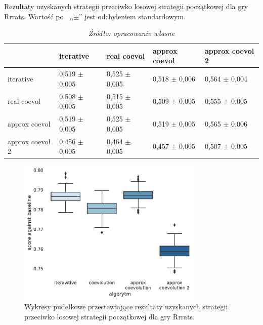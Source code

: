 \documentclass[inzynierska]{pwr_wmat_praca_dyplomowa}
\theoremstyle{plain}
\numberwithin{theorem}{chapter}
\theoremstyle{definition}
\numberwithin{theorem}{chapter}
\begin{document}
	\begin{table}
		\begin{center}
		\caption{Rezultaty uzyskanych strategii przeciwko losowej strategii początkowej dla gry Rrrats. Wartość po  ,,$\pm$'' jest odchyleniem standardowym.}
		\small
		\begin{tabular}{lllll}
			\toprule
			{} &        iterative &      real coevol &    approx coevol &  approx coevol 2 \\
			\midrule
			iterative       &  0,519 $\pm$ 0,005 &  0,525 $\pm$ 0,005 &  0,518 $\pm$ 0,006 &  0,564 $\pm$ 0,004 \\
			real coevol     &  0,508 $\pm$ 0,005 &  0,515 $\pm$ 0,005 &  0,509 $\pm$ 0,005 &  0,555 $\pm$ 0,005 \\
			approx coevol   &  0,519 $\pm$ 0,005 &  0,525 $\pm$ 0,005 &  0,519 $\pm$ 0,005 &  0,565 $\pm$ 0,006 \\
			approx coevol 2 &  0,456 $\pm$ 0,005 &  0,464 $\pm$ 0,005 &  0,457 $\pm$ 0,005 &  0,507 $\pm$ 0,005 \\
			\bottomrule
		\end{tabular}
		\caption*{\textit{Źródło: opracowanie własne}}
		\label{table:rrrats_results_all}
	\end{center}
\end{table}

	\begin{figure}
		\centering
		\includegraphics[width=0.8\textwidth]{imagens/rrrats_results.pdf}
		\caption{Wykresy pudełkowe przestawiające rezultaty uzyskanych strategii przeciwko losowej strategii początkowej dla gry Rrrats.}
		\label{fig:rrrats_results}
	\end{figure}

	\newpage
\end{document}
